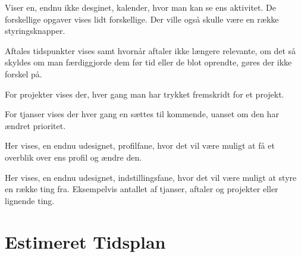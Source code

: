 \documentclass{report}
\begin{document}
Viser en, endnu ikke desginet, kalender, hvor man kan se ens aktivitet. De forskellige opgaver vises lidt forskellige. Der ville også skulle være en række styringsknapper.\par{}
Aftales tidspunkter vises samt hvornår aftaler ikke længere relevante, om det så skyldes om man færdiggjorde dem før tid eller de blot oprendte, gøres der ikke forskel på.\par{}
For projekter vises der, hver gang man har trykket fremskridt for et projekt.\par{}
For tjanser vises der hver gang en sættes til kommende, uanset om den har ændret prioritet.

Her vises, en endnu udesignet, profilfane, hvor det vil være muligt at få et overblik over ens profil og ændre den.

Her vises, en endnu udesignet, indstillingsfane, hvor det vil være muligt at styre en række ting fra. Eksempelvis antallet af tjanser, aftaler og projekter eller lignende ting.

\section{Estimeret Tidsplan}
\label{estTid}


\end{document}
